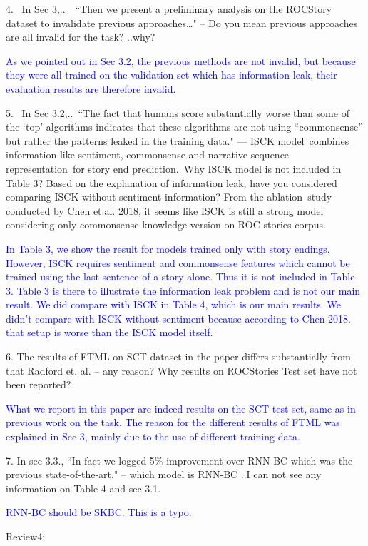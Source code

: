 \documentclass{article}
\newcommand{\shanshan}[1]{\textcolor{blue}{ #1}}
\begin{document}
4.  In Sec 3,..  ``Then we present a preliminary analysis on the ROCStory dataset to invalidate previous approaches…" – Do you mean previous approaches are all invalid for the task? ..why?

	\shanshan{As we pointed out in Sec 3.2, the previous methods are not invalid, but because they were all trained on the validation set which has information leak, their evaluation results are therefore invalid.}

5.  In Sec 3.2,.. ``The fact that humans score substantially worse than some of the `top' algorithms indicates that these algorithms are not using “commonsense” but rather the patterns leaked in the training data." --- ISCK model combines information like sentiment, commonsense and narrative sequence representation for story end prediction. Why ISCK model is not included in Table 3? Based on the explanation of information leak, have you considered comparing ISCK without sentiment information? From the ablation study conducted by Chen et.al. 2018, it seems like ISCK is still a strong model considering only commonsense knowledge version on ROC stories corpus.

\shanshan{In Table 3, we show the result for models trained only with story endings. However, ISCK requires sentiment and commonsense features which cannot be trained using the last sentence of a story alone. Thus it is not included in Table 3. Table 3 is there to illustrate the information leak problem and is not our main result. We did compare with ISCK in Table 4, which is our main results. We didn't compare with ISCK without sentiment because according to Chen 2018. that setup is worse than the ISCK model itself.} 

6. The results of FTML on SCT dataset in the paper differs substantially from that Radford et. al. -- any reason? Why results on ROCStories Test set have not been reported?

	\shanshan{What we report in this paper are indeed results on the SCT test set, same as in previous work on the task. The reason for the different results of FTML was explained in Sec 3, mainly due to the use of different training data.} 
	
7. In sec 3.3., ``In fact we logged 5\% improvement over RNN-BC which was the previous state-of-the-art." – which model is RNN-BC ..I can not see any information on Table 4 and sec 3.1. 

\shanshan{RNN-BC should be SKBC. This is a typo.}

Review4:
\end{document}
